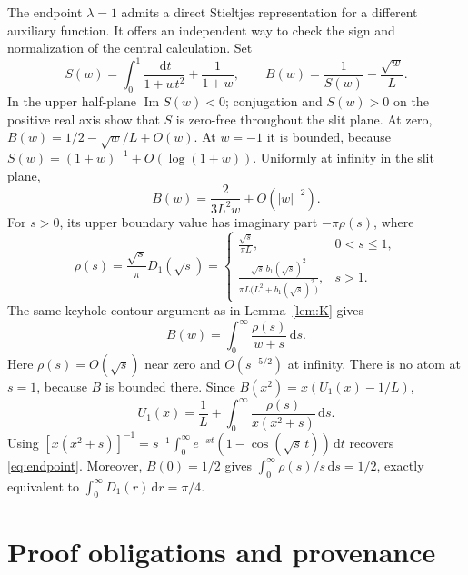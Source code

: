 \documentclass[11pt,a4paper]{article}
\theoremstyle{definition}\newtheorem{definition}[theorem]{Definition}
\theoremstyle{remark}\newtheorem{remark}[theorem]{Remark}
\newcommand{\dd}{\,\mathrm d}
\begin{document}
The endpoint $\lambda=1$ admits a direct Stieltjes representation
for a different auxiliary function. It offers an independent way
to check the sign and normalization of the central calculation.
Set
\[
 S(w)=\int_0^1\frac{\dd t}{1+wt^2}+\frac1{1+w},\qquad
 B(w)=\frac1{S(w)}-\frac{\sqrt w}{L}.
\]
In the upper half-plane $\operatorname{Im}S(w)<0$; conjugation
and $S(w)>0$ on the positive real axis show that $S$ is
zero-free throughout the slit plane. At zero,
$B(w)=1/2-\sqrt w/L+O(w)$. At $w=-1$ it
is bounded, because $S(w)=(1+w)^{-1}+O(\log(1+w))$. Uniformly
at infinity in the slit plane,
\[
 B(w)=\frac{2}{3L^2w}+O(|w|^{-2}).
\]
For $s>0$, its upper boundary value has imaginary part
$-\pi\rho(s)$, where
\begin{equation}\label{eq:rho}
 \rho(s)=\frac{\sqrt s}{\pi}D_1(\sqrt s)
 =\begin{cases}
 \displaystyle\frac{\sqrt s}{\pi L},&0<s\le1,\\[4pt]
 \displaystyle\frac{\sqrt s\,b_1(\sqrt s)^2}
 {\pi L\bigl(L^2+b_1(\sqrt s)^2\bigr)},&s>1.
 \end{cases}
\end{equation}
The same keyhole-contour argument as in Lemma~\ref{lem:K} gives
\[
 B(w)=\int_0^\infty\frac{\rho(s)}{w+s}\dd s.
\]
Here $\rho(s)=O(\sqrt s)$ near zero and $O(s^{-5/2})$ at
infinity. There is no atom at $s=1$, because $B$ is bounded
there. Since $B(x^2)=x(U_1(x)-1/L)$,
\[
 U_1(x)=\frac1L+\int_0^\infty
                 \frac{\rho(s)}{x(x^2+s)}\dd s.
\]
Using
$[x(x^2+s)]^{-1}=s^{-1}\int_0^\infty e^{-xt}
(1-\cos(\sqrt s\,t))\dd t$ recovers \eqref{eq:endpoint}.
Moreover, $B(0)=1/2$ gives
$\int_0^\infty\rho(s)/s\dd s=1/2$, exactly equivalent to
$\int_0^\infty D_1(r)\dd r=\pi/4$.

\section{Proof obligations and provenance}
\end{document}
